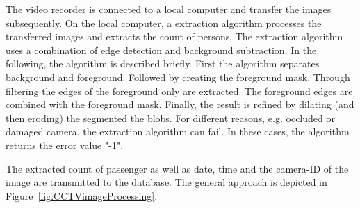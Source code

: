 The video recorder is connected to a local computer and transfer the images subsequently. On the local computer, a extraction algorithm processes the transferred images and extracts the count of persons.
The extraction algorithm uses a combination of edge detection and background subtraction. In the  following, the algorithm is described briefly.
First the algorithm separates background and foreground. Followed by creating the foreground mask.
Through filtering the edges of the foreground only are extracted. The foreground edges are combined with the foreground mask. Finally, the result is refined by dilating (and then eroding) the segmented the blobs.
For different reasons, e.g. occluded or damaged camera, the extraction algorithm can fail. In these cases, the algorithm returns the error value "-1".

The extracted count of passenger as well as date, time and the camera-ID of the image are transmitted to the database. The general approach is depicted in Figure~\ref{fig:CCTVimageProcessing}.

